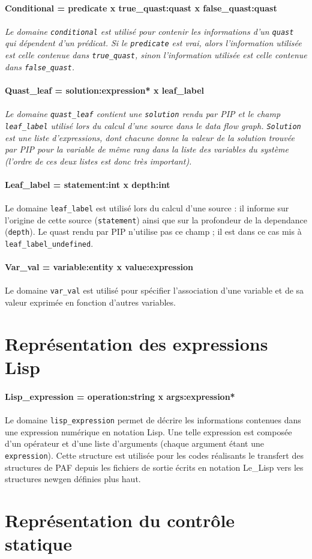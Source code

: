 \documentclass{article}
\newcommand{\domain}[2]{\paragraph{{#1}}\paragraph{}{\em #2}}
\begin{document}
\domain{Conditional = predicate x true\_quast:quast x false\_quast:quast}
{Le domaine {\tt conditional} est utilis\'e pour contenir les informations d'un
{\tt quast} qui d\'ependent d'un pr\'edicat. Si le {\tt predicate} est vrai, 
alors l'information utilis\'ee est celle contenue dans {\tt true\_quast}, sinon
l'information utilis\'ee est celle contenue dans {\tt false\_quast}.}

\domain{Quast\_leaf = solution:expression* x leaf\_label}
{Le domaine {\tt quast\_leaf} contient une {\tt solution} rendu par PIP et 
le champ {\tt leaf\_label} utilis\'e lors du calcul d'une source dans
le data flow graph.
{\tt Solution} est une liste d'expressions, dont chacune donne la valeur de la 
solution trouv\'ee par PIP pour la variable de m\^eme rang dans la liste des 
variables du syst\`eme (l'ordre de ces deux listes est donc {\em tr\`es}
important).}

\domain{Leaf\_label = statement:int x depth:int}
{}

Le domaine {\tt leaf\_label} est utilis\'e lors du calcul d'une source :
il informe sur l'origine de cette source ({\tt statement})  
ainsi que sur la profondeur de la dependance ({\tt depth}).
Le quast rendu par PIP n'utilise pas ce champ ; il est dans ce cas
mis \`a {\tt leaf\_label\_undefined}.

\domain{Var\_val = variable:entity x value:expression}
{}

Le domaine {\tt var\_val} est utilis\'e pour sp\'ecifier l'association d'une 
variable et de sa valeur exprim\'ee en fonction d'autres variables.


\section{Repr\'esentation des expressions Lisp}

\domain{Lisp\_expression = operation:string x args:expression*}
{}

Le domaine {\tt lisp\_expression} permet de d\'ecrire les informations 
contenues dans une expression num\'erique en notation Lisp. Une telle 
expression est compos\'ee d'un op\'erateur et d'une liste d'arguments (chaque 
argument \'etant une {\tt expression}). Cette structure est utilis\'ee pour les
codes r\'ealisants le transfert des structures de PAF depuis les fichiers de 
sortie \'ecrits en notation Le\_Lisp vers les structures newgen d\'efinies plus
haut.

\section{Repr\'esentation du contr\^ole statique}
\end{document}
